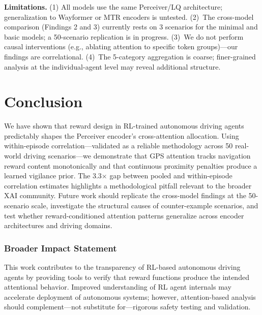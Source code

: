 \documentclass[10pt]{article} %
\begin{document}
\textbf{Limitations.} (1) All models use the same Perceiver/LQ architecture; generalization to Wayformer \citep{nayakanti2023wayformer} or MTR \citep{shi2024mtr} encoders is untested. (2)~The cross-model comparison (Findings 2 and 3) currently rests on 3 scenarios for the minimal and basic models; a 50-scenario replication is in progress. (3)~We do not perform causal interventions (e.g., ablating attention to specific token groups)---our findings are correlational. (4)~The 5-category aggregation is coarse; finer-grained analysis at the individual-agent level may reveal additional structure.


\section{Conclusion}
\label{sec:conclusion}

We have shown that reward design in RL-trained autonomous driving agents predictably shapes the Perceiver encoder's cross-attention allocation. Using within-episode correlation---validated as a reliable methodology across 50 real-world driving scenarios---we demonstrate that GPS attention tracks navigation reward content monotonically and that continuous proximity penalties produce a learned vigilance prior. The 3.3$\times$ gap between pooled and within-episode correlation estimates highlights a methodological pitfall relevant to the broader XAI community. Future work should replicate the cross-model findings at the 50-scenario scale, investigate the structural causes of counter-example scenarios, and test whether reward-conditioned attention patterns generalize across encoder architectures and driving domains.

\subsubsection*{Broader Impact Statement}
\label{sec:broaderImpact}
This work contributes to the transparency of RL-based autonomous driving agents by providing tools to verify that reward functions produce the intended attentional behavior. Improved understanding of RL agent internals may accelerate deployment of autonomous systems; however, attention-based analysis should complement---not substitute for---rigorous safety testing and validation.


\appendix
\end{document}
